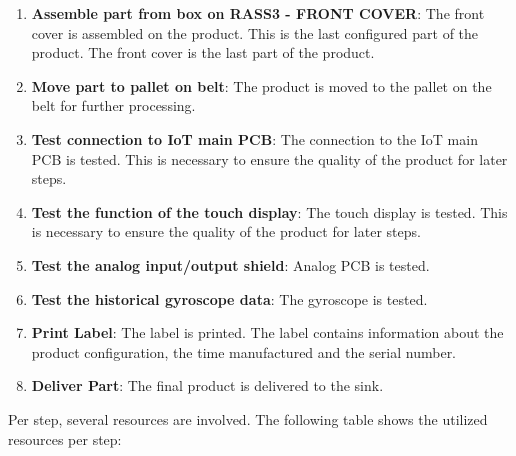 \begin{enumerate}
  \item \textbf{Assemble part from box on RASS3 - FRONT COVER}: The front cover is assembled on the product. This is the last configured part of the product. The front cover is the last part of the product.
  \item \textbf{Move part to pallet on belt}: The product is moved to the pallet on the belt for further processing.
  \item \textbf{Test connection to IoT main PCB}: The connection to the IoT main PCB is tested. This is necessary to ensure the quality of the product for later steps.
  \item \textbf{Test the function of the touch display}: The touch display is tested. This is necessary to ensure the quality of the product for later steps.
  \item \textbf{Test the analog input/output shield}: Analog PCB is tested.
  \item \textbf{Test the historical gyroscope data}: The gyroscope is tested.
  \item \textbf{Print Label}: The label is printed. The label contains information about the product configuration, the time manufactured and the serial number.
  \item \textbf{Deliver Part}: The final product is delivered to the sink.
\end{enumerate}

Per step, several resources are involved. The following table shows the utilized resources per step:

